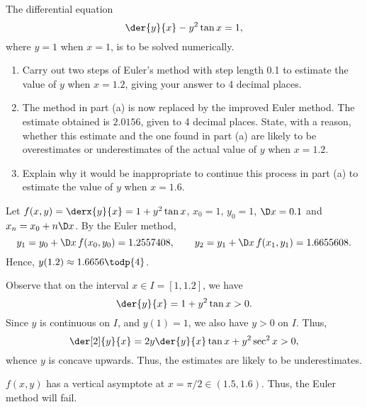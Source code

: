 \begin{problem}
    The differential equation \[\der{y}{x} - y^2 \tan x = 1,\] where $y = 1$ when $x = 1$, is to be solved numerically.
    \begin{enumerate}
        \item Carry out two steps of Euler's method with step length 0.1 to estimate the value of $y$ when $x = 1.2$, giving your answer to 4 decimal places.
        \item The method in part (a) is now replaced by the improved Euler method. The estimate obtained is $2.0156$, given to 4 decimal places. State, with a reason, whether this estimate and the one found in part (a) are likely to be overestimates or underestimates of the actual value of $y$ when $x = 1.2$.
        \item Explain why it would be inappropriate to continue this process in part (a) to estimate the value of $y$ when $x = 1.6$.
    \end{enumerate}
\end{problem}
\begin{solution}
    \begin{ppart}
        Let $f(x, y) = \derx{y}{x} = 1 + y^2 \tan x$, $x_0 = 1$, $y_0 = 1$, $\D x = 0.1$ and $x_n = x_0 + n \D x$. By the Euler method, \[y_1 = y_0 + \D x \, f(x_0, y_0) = 1.2557408, \qquad y_2 = y_1 + \D x \, f(x_1, y_1) = 1.6655608.\] Hence, $y(1.2) \approx 1.6656 \todp{4}$.
    \end{ppart}
    \begin{ppart}
        Observe that on the interval $x \in I = [1, 1.2]$, we have \[\der{y}{x} = 1 + y^2 \tan x > 0.\] Since $y$ is continuous on $I$, and $y(1) = 1$, we also have $y > 0$ on $I$. Thus, \[\der[2]{y}{x} = 2y \der{y}{x} \tan x + y^2 \sec^2 x > 0,\] whence $y$ is concave upwards. Thus, the estimates are likely to be underestimates.
    \end{ppart}
    \begin{ppart}
        $f(x, y)$ has a vertical asymptote at $x = \pi/2 \in (1.5, 1.6)$. Thus, the Euler method will fail.
    \end{ppart}
\end{solution}